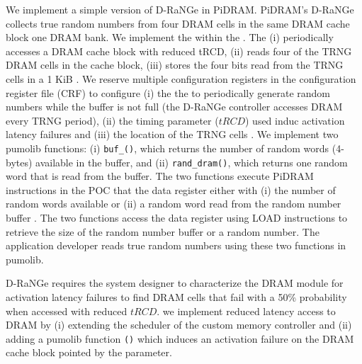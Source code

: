 We implement a simple version of D-RaNGe in PiDRAM. PiDRAM's D-RaNGe  collects true random numbers from four DRAM cells in the same DRAM cache block %
 one DRAM bank. 
We implement the  within the . The  (i) periodically accesses a DRAM cache block with reduced tRCD, (ii) reads four of the TRNG DRAM cells in the cache block, (iii) stores the four bits read from the TRNG cells in a 1 KiB . We reserve multiple configuration registers in the configuration register file (CRF) to configure (i) the  the  to periodically generate random numbers  while the buffer is not full (the D-RaNGe controller accesses DRAM every TRNG period), (ii) the timing parameter ($tRCD$) used  induc activation latency failures and (iii) the  location  of the TRNG cells . We implement two pumolib functions: (i) \texttt{buf\_()}, which returns the number of random words (4-bytes) available in the buffer, and (ii) \texttt{rand\_dram()}, which returns one random word that is read from the buffer. {The two functions  execute PiDRAM instructions in the POC that  the data register either with (i) the number of random words available  or (ii) a random word read from the random number buffer . The two functions  access the data register using LOAD instructions to retrieve  the size of the random number buffer or a random number.} The application developer reads true random numbers using these two functions in pumolib.

\noindent
\textbf{} D-RaNGe requires the system designer to characterize the DRAM module for activation latency failures to find DRAM cells that fail with a 50\% probability  when accessed with reduced $tRCD$.   we implement reduced latency access to DRAM by (i) extending the scheduler of the custom memory controller and (ii) adding a pumolib function \texttt{()} which induces an activation failure on the DRAM cache block pointed by the \texttt{} parameter.

